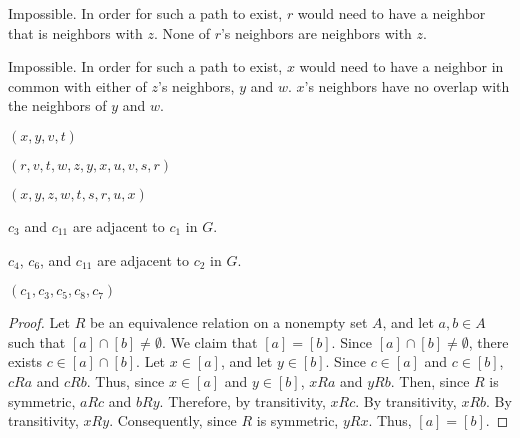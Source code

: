 \documentclass[12pt]{article}
\begin{document}

    Impossible. In order for such a path to exist, $r$ would need to have a neighbor that is neighbors with $z$. None of $r$'s neighbors are neighbors with $z$.


    Impossible. In order for such a path to exist, $x$ would need to have a neighbor in common with either of $z$'s neighbors, $y$ and $w$. $x$'s neighbors have no overlap with the neighbors of $y$ and $w$.
    

    $(x, y, v, t)$


    $(r, v, t, w, z, y, x, u, v, s, r)$


    $(x, y, z, w, t, s, r, u, x)$

\newpage
{}


    $c_3$ and $c_{11}$ are adjacent to $c_1$ in $G$.


    $c_4$, $c_6$, and $c_{11}$ are adjacent to $c_2$ in $G$.




    $(c_1, c_3, c_5, c_8, c_7)$

\bigskip
\begin{proof}
    Let $R$ be an equivalence relation on a nonempty set $A$, and let $a,b \in A$ such that $[a] \cap [b] \neq \emptyset$.
    We claim that $[a] = [b]$.
    Since $[a] \cap [b] \neq \emptyset$, there exists $c \in [a] \cap [b]$.
    Let $x \in [a]$, and let $y \in [b]$.
    Since $c \in [a]$ and $c \in [b]$, $c R a$ and $c R b$.
    Thus, since $x \in [a]$ and $y \in [b]$, $x R a$ and $y R b$.
    Then, since $R$ is symmetric, $a R c$ and $b R y$.
    Therefore, by transitivity, $x R c$.
    By transitivity, $x R b$. %
    By transitivity, $x R y$.
    Consequently, since $R$ is symmetric, $y R x$.
    Thus, $[a] = [b]$.
\end{proof}
\end{document}
